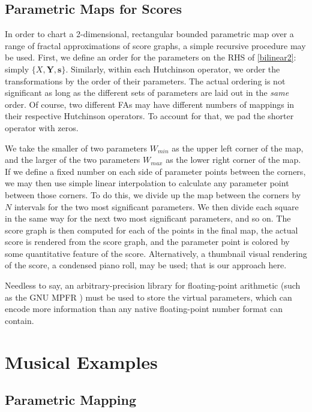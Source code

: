 \documentclass[english,11pt,letterpaper,onecolumn]{scrartcl}
\numberwithin{equation}{section}
\begin{document}
\subsection{Parametric Maps for Scores}

In order to chart a 2-dimensional, rectangular bounded parametric map over a
range of fractal approximations of score graphs, a simple recursive procedure
may be used. First, we define an order for the parameters on the RHS of
\eqref{bilinear2}: simply $\{X, \mathbf{Y}, \mathbf{s}\}$. Similarly, within
each Hutchinson operator, we order the transformations by the order of their
parameters. The actual ordering is not significant as long as the different sets
of parameters are laid out in the \textit{same} order. Of course, two different
FAs may have different numbers of mappings in their respective Hutchinson
operators. To account for that, we pad the shorter operator with zeros.

We take the smaller of two parameters $W_{min}$ as the upper left corner of the
map, and the larger of the two parameters $W_{max}$ as the lower right corner of
the map. If we define a fixed number on each side of parameter points between
the corners, we may then use simple linear interpolation to calculate any
parameter point between those corners. To do this, we divide up the map between
the corners by $N$ intervals for the two most significant parameters. We then
divide each square in the same way for the next two most significant parameters,
and so on. The score graph is then computed for each of the points in the final
map, the actual score is rendered from the score graph, and the parameter point
is colored by some quantitative feature of the score. Alternatively, a thumbnail
visual rendering of the score, a condensed piano roll, may be used; that is our
approach here.

Needless to say, an arbitrary-precision library for floating-point arithmetic
(such as the GNU MPFR \cite{Fousse:2007:MMB:1236463.1236468}) must be used to
store the virtual parameters, which can encode more information than any native
floating-point number format can contain.

\section{Musical Examples}

\subsection{Parametric Mapping}
\end{document}
